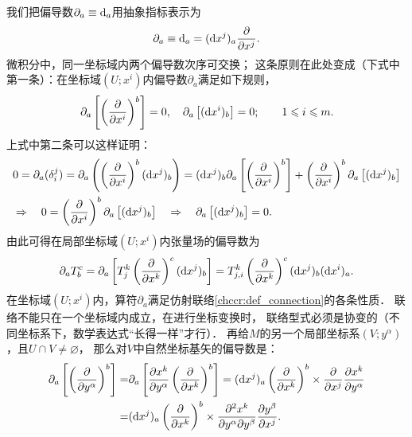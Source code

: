 我们把偏导数$\partial_a\equiv {\rm d }_a$用抽象指标表示为
\begin{equation}\label{chccr:eqn_partial-d}
    \partial_a \equiv {\rm d }_a = ({\rm d }x^j)_a \frac{\partial}{\partial x^j} .
\end{equation}
微积分中，同一坐标域内两个偏导数次序可交换；
这条原则在此处变成（下式中第一条）：在坐标域$(U;x^i)$内偏导数$\partial_a$满足如下规则，
\begin{equation}\label{chccr:eqn_dpdd=0}
    \partial_a \left[ \left(\frac{\partial }{\partial x^i}\right) ^b \right] =0, \quad
    \partial_a \left[ ({\rm d }x^i)_b \right] = 0; \qquad 1 \leqslant i \leqslant m .
\end{equation}
上式中第二条可以这样证明：
\begin{align*}
  &0=\partial_a(\delta^j_i)=\partial_a\left( \left(\frac{\partial }{\partial x^i}\right) ^b
 ({\rm d }x^j)_b \right)=({\rm d }x^j)_b\partial_a \left[ \left(\frac{\partial }{\partial x^i}\right) ^b \right]
 + \left(\frac{\partial }{\partial x^i}\right) ^b\partial_a \left[ ({\rm d }x^j)_b \right] \\
 &\Rightarrow \quad 0=\left(\frac{\partial }{\partial x^i}\right) ^b \partial_a \left[ ({\rm d }x^j)_b \right]
 \quad \Rightarrow\quad  \partial_a \left[ ({\rm d }x^j)_b \right] = 0 .
\end{align*}
由此可得在局部坐标域$(U;x^i)$内张量场的偏导数为
\begin{equation}
    \partial_a T^c_b = \partial_a \left[T^k_j \left(\frac{\partial }{\partial x^k}\right) ^c
      ({\rm d }x^j)_b \right] = T^k_{j,i} \left(\frac{\partial }{\partial x^k}\right) ^c
      ({\rm d }x^j)_b  ({\rm d }x^i)_a.
\end{equation}
在坐标域$(U;x^i)$内，算符$\partial_a$满足仿射联络\ref{chccr:def_connection}的各条性质．
联络不能只在一个坐标域内成立，在进行坐标变换时，
联络型式必须是协变的（不同坐标系下，数学表达式“长得一样”才行）．
再给$M$的另一个局部坐标系$(V;y^\alpha)$，且$U\cap V \neq \varnothing$，
那么对$V$中自然坐标基矢的偏导数是：
\begin{align*}
    \partial_a \left[ \left(\frac{\partial }{\partial y^\alpha}\right) ^b \right]
    =& \partial_a \left[\frac{\partial x^k}{\partial y^\alpha}
      \left(\frac{\partial }{\partial x^k}\right) ^b \right]
    = ({\rm d }x^j)_a \left(\frac{\partial }{\partial x^k}\right) ^b \times
      \frac{\partial}{\partial x^j}\frac{\partial x^k}{\partial y^\alpha} \\
    =& ({\rm d }x^j)_a \left(\frac{\partial }{\partial x^k}\right) ^b\times
     \frac{\partial^2 x^k}{\partial y^\alpha\partial y^\beta}
     \frac{\partial y^\beta}{\partial x^j} .
\end{align*}
